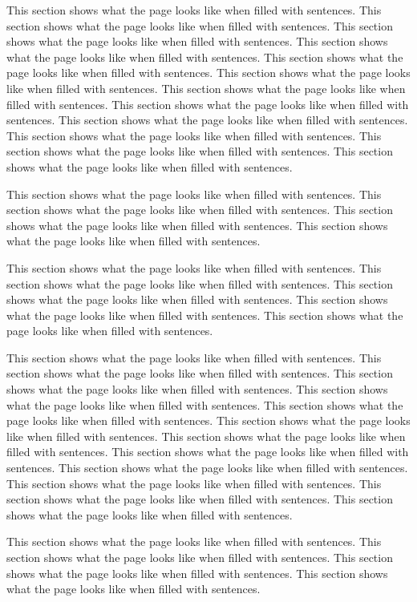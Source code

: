 This section shows what the page looks like when filled with sentences.
This section shows what the page looks like when filled with sentences.
This section shows what the page looks like when filled with sentences.
This section shows what the page looks like when filled with sentences.
This section shows what the page looks like when filled with sentences.
This section shows what the page looks like when filled with sentences.
This section shows what the page looks like when filled with sentences.
This section shows what the page looks like when filled with sentences.
This section shows what the page looks like when filled with sentences.
This section shows what the page looks like when filled with sentences.
This section shows what the page looks like when filled with sentences.
This section shows what the page looks like when filled with sentences.

This section shows what the page looks like when filled with sentences.
This section shows what the page looks like when filled with sentences.
This section shows what the page looks like when filled with sentences.
This section shows what the page looks like when filled with sentences.

This section shows what the page looks like when filled with sentences.
This section shows what the page looks like when filled with sentences.
This section shows what the page looks like when filled with sentences.
This section shows what the page looks like when filled with sentences.
This section shows what the page looks like when filled with sentences.

This section shows what the page looks like when filled with sentences.
This section shows what the page looks like when filled with sentences.
This section shows what the page looks like when filled with sentences.
This section shows what the page looks like when filled with sentences.
This section shows what the page looks like when filled with sentences.
This section shows what the page looks like when filled with sentences.
This section shows what the page looks like when filled with sentences.
This section shows what the page looks like when filled with sentences.
This section shows what the page looks like when filled with sentences.
This section shows what the page looks like when filled with sentences.
This section shows what the page looks like when filled with sentences.
This section shows what the page looks like when filled with sentences.

This section shows what the page looks like when filled with sentences.
This section shows what the page looks like when filled with sentences.
This section shows what the page looks like when filled with sentences.
This section shows what the page looks like when filled with sentences.

